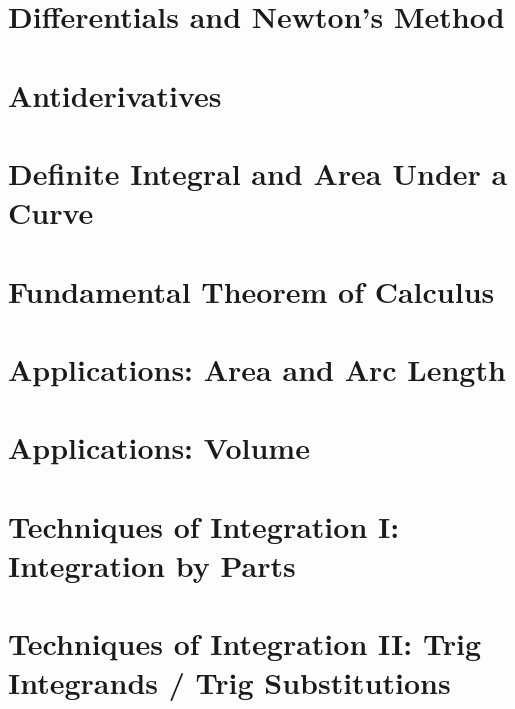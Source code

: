 \documentclass[10pt]{article}  %
\begin{document}
\section{Differentials and Newton's Method}


\section{Antiderivatives}


\section{Definite Integral and Area Under a Curve}


\section{Fundamental Theorem of Calculus}


\section{Applications: Area and Arc Length}


\section{Applications: Volume}


\section{Techniques of Integration I: Integration by Parts}


\section{Techniques of Integration II: Trig Integrands / Trig Substitutions}

\end{document}
